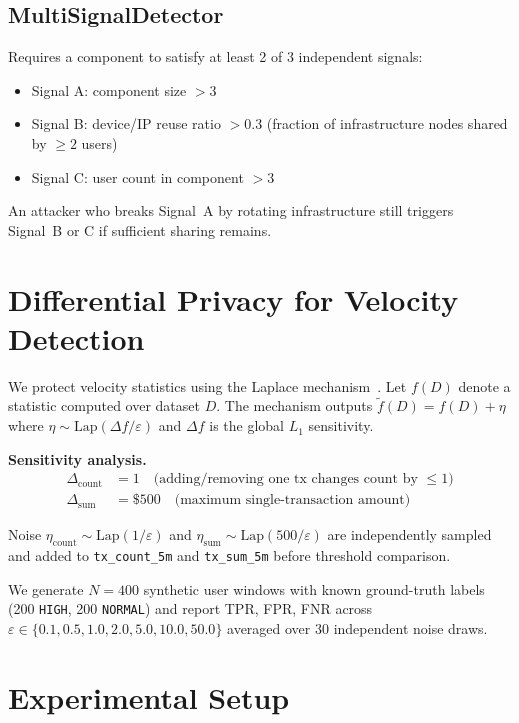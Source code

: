 \documentclass[sigconf,nonacm]{acmart}
\newcommand{\eps}{\varepsilon}
\newcommand{\lap}{\mathrm{Lap}}
\begin{document}
\subsection{MultiSignalDetector}
Requires a component to satisfy at least 2 of 3 independent signals:
\begin{itemize}
  \item Signal A: component size $> 3$
  \item Signal B: device/IP reuse ratio $> 0.3$
        (fraction of infrastructure nodes shared by ${\geq}2$ users)
  \item Signal C: user count in component $> 3$
\end{itemize}
An attacker who breaks Signal~A by rotating infrastructure still triggers
Signal~B or C if sufficient sharing remains.

\section{Differential Privacy for Velocity Detection}

We protect velocity statistics using the Laplace
mechanism~\cite{dwork2014}.  Let $f(D)$ denote a statistic computed over
dataset $D$.  The mechanism outputs $\tilde{f}(D) = f(D) + \eta$ where
$\eta \sim \lap(\Delta f / \eps)$ and $\Delta f$ is the global $L_1$
sensitivity.

\noindent\textbf{Sensitivity analysis.}
\begin{align}
  \Delta_{\mathrm{count}} &= 1
    \quad\text{(adding/removing one tx changes count by $\leq 1$)} \\
  \Delta_{\mathrm{sum}} &= \$500
    \quad\text{(maximum single-transaction amount)}
\end{align}

Noise $\eta_{\mathrm{count}} \sim \lap(1/\eps)$ and
$\eta_{\mathrm{sum}} \sim \lap(500/\eps)$ are independently sampled and
added to \texttt{tx\_count\_5m} and \texttt{tx\_sum\_5m} before threshold
comparison.

We generate $N = 400$ synthetic user windows with known ground-truth labels
(200 \texttt{HIGH}, 200 \texttt{NORMAL}) and report TPR, FPR, FNR across
$\eps \in \{0.1, 0.5, 1.0, 2.0, 5.0, 10.0, 50.0\}$ averaged over 30
independent noise draws.

\section{Experimental Setup}
\end{document}
